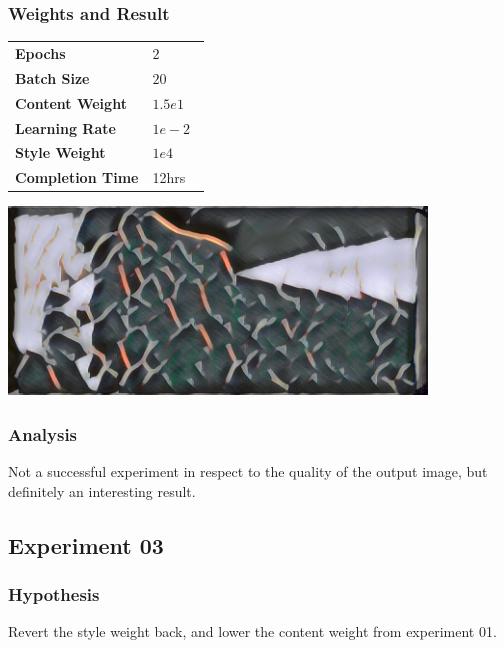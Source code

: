\documentclass[12pt]{article}
\begin{document}
\subsubsection{Weights and Result}
\begin{minipage}[t]{0.4\textwidth}
\begin{tabular}{l l}
    \textbf{Epochs}          & $2$     \\
    \textbf{Batch Size}      & $20$    \\
    \textbf{Content Weight}  & $1.5e1$ \\
    \textbf{Learning Rate}   & $1e-2$  \\
    \textbf{Style Weight}    & $1e4$   \\
    \textbf{Completion Time} & 12hrs \
\vspace{3.5cm}\\
\end{tabular}
\end{minipage}
\begin{minipage}{0.1\textwidth}
\end{minipage}
\begin{minipage}[t]{0.6\textwidth}
\includegraphics[height=50mm]{visuals/results/02.png}
\end{minipage} \vspace{-3cm}
\subsubsection{Analysis}
Not a successful experiment in respect to the quality of the output image, but definitely an interesting result.


\subsection{Experiment 03}
\subsubsection{Hypothesis} Revert the style weight back, and lower the content weight from experiment 01.
\end{document}
